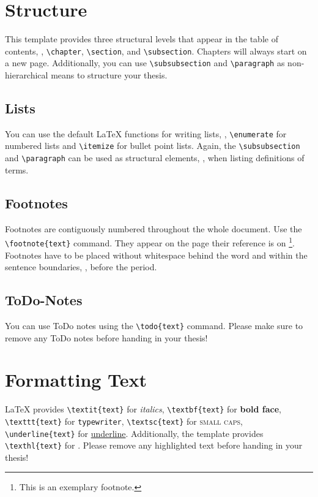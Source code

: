 \section{Structure}
This template provides three structural levels that appear in the table of contents, \viz, \texttt{\textbackslash chapter}, \texttt{\textbackslash section}, and \texttt{\textbackslash subsection}. Chapters will always start on a new page. Additionally, you can use \texttt{\textbackslash subsubsection} and \texttt{\textbackslash paragraph} as non-hierarchical means to structure your thesis.


\subsection{Lists}
You can use the default \LaTeX \- functions for writing lists, \viz, \texttt{\textbackslash enumerate} for numbered lists and \texttt{\textbackslash itemize} for bullet point lists. Again, the \texttt{\textbackslash subsubsection} and \texttt{\textbackslash paragraph} can be used as structural elements, \eg, when listing definitions of terms.

\subsection{Footnotes}
Footnotes are contiguously numbered throughout the whole document. Use the \texttt{\textbackslash footnote\{text\}} command.  They appear on the page their reference is on \footnote{This is an exemplary footnote.}. Footnotes have to be placed without whitespace behind the word and within the sentence boundaries, \ie, before the period.

\subsection{ToDo-Notes}
You can use ToDo notes using the \texttt{\textbackslash todo\{text\}}  command. Please make sure to remove any ToDo notes before handing in your thesis! 

\section{Formatting Text}
\LaTeX \- provides \texttt{\textbackslash textit\{text\}} for \textit{italics}, \texttt{\textbackslash textbf\{text\}} for \textbf{bold face}, \texttt{\textbackslash texttt\{text\}} for \texttt{typewriter}, \texttt{\textbackslash textsc\{text\}} for \textsc{small caps}, \texttt{\textbackslash underline\{text\}} for \underline{underline}. Additionally, the template provides  \texttt{\textbackslash texthl\{text\}} for . Please remove any highlighted text before handing in your thesis!

